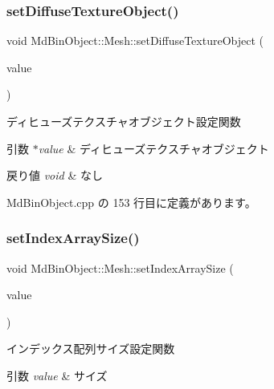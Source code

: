 \subsubsection{\texorpdfstring{set\+Diffuse\+Texture\+Object()}{setDiffuseTextureObject()}}
{\footnotesize\ttfamily void Md\+Bin\+Object\+::\+Mesh\+::set\+Diffuse\+Texture\+Object (\begin{DoxyParamCaption}\item[{\mbox{\hyperlink{class_texture_object}{Texture\+Object}} $\ast$}]{value }\end{DoxyParamCaption})}



ディヒューズテクスチャオブジェクト設定関数 


\begin{DoxyParams}{引数}
{\em $\ast$value} & ディヒューズテクスチャオブジェクト \\
\hline
\end{DoxyParams}

\begin{DoxyRetVals}{戻り値}
{\em void} & なし \\
\hline
\end{DoxyRetVals}


 Md\+Bin\+Object.\+cpp の 153 行目に定義があります。

\mbox{\label{class_md_bin_object_1_1_mesh_a50cefabfd848ba6aa4ab192e1587fb3e}} 
\subsubsection{\texorpdfstring{set\+Index\+Array\+Size()}{setIndexArraySize()}}
{\footnotesize\ttfamily void Md\+Bin\+Object\+::\+Mesh\+::set\+Index\+Array\+Size (\begin{DoxyParamCaption}\item[{int}]{value }\end{DoxyParamCaption})}



インデックス配列サイズ設定関数 


\begin{DoxyParams}{引数}
{\em value} & サイズ \\
\hline
\end{DoxyParams}

